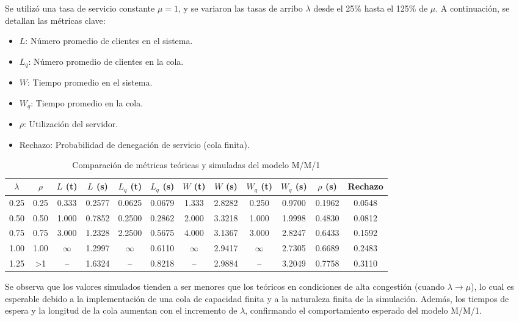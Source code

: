\documentclass{article}
\begin{document}
Se utilizó una tasa de servicio constante $\mu = 1$, y se variaron las tasas de arribo $\lambda$ desde el 25\% hasta el 125\% de $\mu$. A continuación, se detallan las métricas clave:


\begin{itemize}
    \item $L$: Número promedio de clientes en el sistema.
    \item $L_q$: Número promedio de clientes en la cola.
    \item $W$: Tiempo promedio en el sistema.
    \item $W_q$: Tiempo promedio en la cola.
    \item $\rho$: Utilización del servidor.
    \item Rechazo: Probabilidad de denegación de servicio (cola finita).
\end{itemize}


\begin{table}[H]
\centering
\caption{Comparación de métricas teóricas y simuladas del modelo M/M/1}
\begin{tabular}{|c|c|c|c|c|c|c|c|c|c|c|c|}
\hline
$\lambda$ & $\rho$ & $L$ (t) & $L$ (s) & $L_q$ (t) & $L_q$ (s) & $W$ (t) & $W$ (s) & $W_q$ (t) & $W_q$ (s) & $\rho$ (s) & Rechazo \\
\hline
0.25 & 0.25 & 0.333 & 0.2577 & 0.0625 & 0.0679 & 1.333 & 2.8282 & 0.250 & 0.9700 & 0.1962 & 0.0548 \\
0.50 & 0.50 & 1.000 & 0.7852 & 0.2500 & 0.2862 & 2.000 & 3.3218 & 1.000 & 1.9998 & 0.4830 & 0.0812 \\
0.75 & 0.75 & 3.000 & 1.2328 & 2.2500 & 0.5675 & 4.000 & 3.1367 & 3.000 & 2.8247 & 0.6433 & 0.1592 \\
1.00 & 1.00 & $\infty$ & 1.2997 & $\infty$ & 0.6110 & $\infty$ & 2.9417 & $\infty$ & 2.7305 & 0.6689 & 0.2483 \\
1.25 & >1 & -- & 1.6324 & -- & 0.8218 & -- & 2.9884 & -- & 3.2049 & 0.7758 & 0.3110 \\
\hline
\end{tabular}
\end{table}


\vspace{0.5em}


Se observa que los valores simulados tienden a ser menores que los teóricos en condiciones de alta congestión (cuando $\lambda \rightarrow \mu$), lo cual es esperable debido a la implementación de una cola de capacidad finita y a la naturaleza finita de la simulación. Además, los tiempos de espera y la longitud de la cola aumentan con el incremento de $\lambda$, confirmando el comportamiento esperado del modelo M/M/1.
\end{document}
